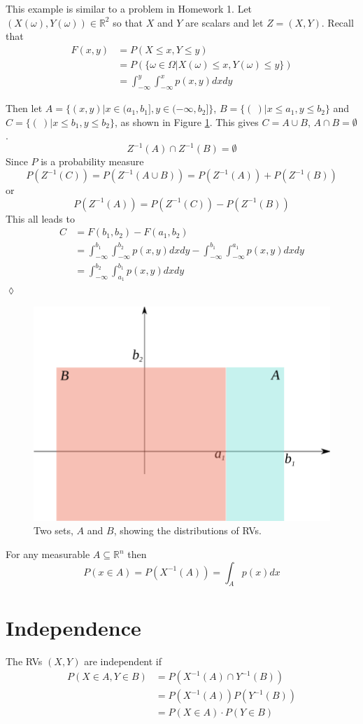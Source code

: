 \documentclass[lecture,12pt,]{pcms-l}
\begin{document}
\begin{example}
This example is similar to a problem in Homework 1. Let $(X(\omega),Y(\omega)) \in \mathbb{R}^2$ so that $X$ and $Y$ are scalars and let $Z=(X,Y)$. Recall that
\begin{align*}
F(x,y) &= P(X\leq x, Y\leq y) \\
&= P(\lbrace \omega\in\Omega | X(\omega)\leq x, Y(\omega)\leq y\rbrace) \\
&= \int_{-\infty}^y\int_{-\infty}^x p(x,y)dxdy
\end{align*}

Then let $A=\lbrace(x,y) | x\in(a_1,b_1], y\in(-\infty,b_2]\rbrace$, $B=\lbrace(~) | x\leq a_1, y\leq b_2\rbrace$ and $C=\lbrace(~)|x\leq b_1, y\leq b_2\rbrace$, as shown in Figure \ref{fig:02twoSets}. This gives $C=A\cup B$, $A\cap B=\emptyset$.
$$Z^{-1}(A)\cap Z^{-1}(B) = \emptyset$$
Since $P$ is a probability measure
$$P(Z^{-1}(C)) = P(Z^{-1}(A\cup B)) = P(Z^{-1}(A))+P(Z^{-1}(B))$$
or
$$P(Z^{-1}(A))=P(Z^{-1}(C))-P(Z^{-1}(B))$$
This all leads to
\begin{align*}
C &= F(b_1,b_2) - F(a_1,b_2) \\
&= \int_{-\infty}^{b_1}\int_{-\infty}^{b_2} p(x,y)dxdy - \int_{-\infty}^{b_1}\int_{-\infty}^{a_1}p(x,y)dxdy \\
&= \int_{-\infty}^{b_2}\int_{a_1}^{b_1} p(x,y)dxdy
\end{align*}
$\lozenge$
\end{example}
\begin{figure}[ht!]
	\centering
	\includegraphics[width=.35\textwidth]{images/02twoSets}
	\caption{Two sets, $A$ and $B$, showing the distributions of RVs.}
	\label{fig:02twoSets}
\end{figure}

\begin{theorem}
For any measurable $A\subseteq\mathbb{R}^n$ then
$$P(x\in A)=P(X^{-1}(A)) = \int_Ap(x)dx$$
\end{theorem}

\section{Independence}
\begin{definition}
The RVs $(X,Y)$ are independent if
\begin{align*}
P(X\in A, Y\in B) &= P(X^{-1}(A) \cap Y^{-1}(B)) \\
&= P(X^{-1}(A)) P(Y^{-1}(B)) \\
&= P(X\in A) \cdot P(Y\in B)
\end{align*}
\end{definition}
\end{document}
